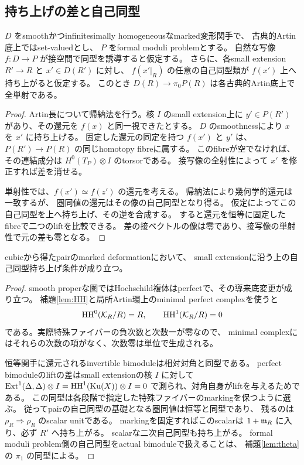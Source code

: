 \subsection{持ち上げの差と自己同型}

\begin{lemma}[Artin帰納法]\label{lem:induction}
 \(D\) をsmoothかつinfinitesimally homogeneousなmarked変形関手で、
 古典的Artin底上ではset-valuedとし、
 \(P\) をformal moduli problemとする。
 自然な写像 \(f:D\to P\) が接空間で同型を誘導すると仮定する。
 さらに、各small extension \(R'\to R\) と \(x'\in D(R')\) に対し、
 \(f(x'\vert_R)\) の任意の自己同型類が \(f(x')\) 上へ持ち上がると仮定する。
 このとき \(D(R)\to\pi_0P(R)\) は各古典的Artin底上で全単射である。
\end{lemma}
\begin{proof}
 Artin長について帰納法を行う。核 \(I\) のsmall extension上に
 \(y'\in P(R')\) があり、その還元を \(f(x)\) と同一視できたとする。
 \(D\) のsmoothnessにより \(x\) を \(x'\) に持ち上げる。
 固定した還元の同定を持つ \(f(x')\) と \(y'\) は、
 \(P(R')\to P(R)\) の同じhomotopy fibreに属する。
 このfibreが空でなければ、その連結成分は
 \(H^0(T_P)\otimes I\) のtorsorである。
 接写像の全射性によって \(x'\) を修正すれば差を消せる。

 単射性では、\(f(x')\simeq f(z')\) の還元を考える。
 帰納法により幾何学的還元は一致するが、
 圏同値の還元はその像の自己同型となり得る。
 仮定によってこの自己同型を上へ持ち上げ、その逆を合成する。
 すると還元を恒等に固定したfibreで二つのliftを比較できる。
 差の接ベクトルの像は零であり、接写像の単射性で元の差も零となる。
\end{proof}

\begin{lemma}\label{lem:automorphisms}
 cubicから得たpairのmarked deformationにおいて、
 small extensionに沿う上の自己同型持ち上げ条件が成り立つ。
\end{lemma}
\begin{proof}
 smooth properな圏ではHochschild複体はperfectで、その導来底変更が成り立つ。
 補題\ref{lem:HH}と局所Artin環上のminimal perfect complexを使うと
 \[
 \operatorname{HH}^0(\mathcal K_R/R)=R,\qquad \operatorname{HH}^1(\mathcal K_R/R)=0
 \]
 である。実際特殊ファイバーの負次数と次数一が零なので、
 minimal complexにはそれらの次数の項がなく、次数零は単位で生成される。

 恒等関手に還元されるinvertible bimoduleは相対対角と同型である。
 perfect bimoduleのliftの差はsmall extensionの核 \(I\) に対して
 \(\operatorname{Ext}^1(\Delta,\Delta)\otimes I=\operatorname{HH}^1(\operatorname{Ku}(X))\otimes I=0\)
 で測られ、対角自身がliftを与えるためである。
 この同型は各段階で指定した特殊ファイバーのmarkingを保つように選ぶ。
 従ってpairの自己同型の基礎となる圏同値は恒等と同型であり、
 残るのは \(\rho_R\Rightarrow\rho_R\) のscalar unitである。
 markingを固定すればこのscalarは \(1+\mathfrak m_R\) に入り、必ず \(R'\) へ持ち上がる。
 scalarな二次自己同型も持ち上がる。
 formal moduli problem側の自己同型をactual bimoduleで扱えることは、
 補題\ref{lem:theta}の \(\pi_1\) の同型による。
\end{proof}

